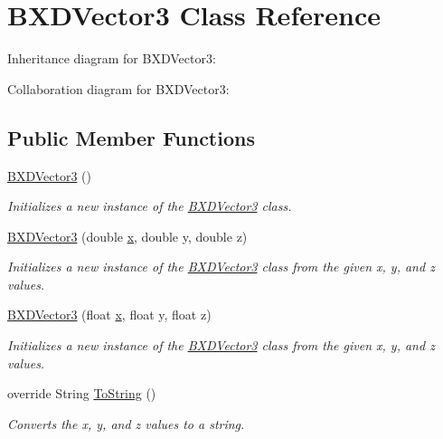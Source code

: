 \hypertarget{class_b_x_d_vector3}{}\section{B\+X\+D\+Vector3 Class Reference}
\label{class_b_x_d_vector3}


Inheritance diagram for B\+X\+D\+Vector3\+:


Collaboration diagram for B\+X\+D\+Vector3\+:
\subsection*{Public Member Functions}
\begin{DoxyCompactItemize}
\item 
\hyperlink{class_b_x_d_vector3_a0e2a2ec4422390656dc569146bbceb5b}{B\+X\+D\+Vector3} ()
\begin{DoxyCompactList}\small\item\em Initializes a new instance of the \hyperlink{class_b_x_d_vector3}{B\+X\+D\+Vector3} class. \end{DoxyCompactList}\item 
\hyperlink{class_b_x_d_vector3_a586261e067ed628788df3fede2d96427}{B\+X\+D\+Vector3} (double \hyperlink{class_b_x_d_vector3_a46633bfd92ba8052494bc1918d1762a4}{x}, double y, double z)
\begin{DoxyCompactList}\small\item\em Initializes a new instance of the \hyperlink{class_b_x_d_vector3}{B\+X\+D\+Vector3} class from the given x, y, and z values. \end{DoxyCompactList}\item 
\hyperlink{class_b_x_d_vector3_a587219cbfe9a71512df003856ad79b7a}{B\+X\+D\+Vector3} (float \hyperlink{class_b_x_d_vector3_a46633bfd92ba8052494bc1918d1762a4}{x}, float y, float z)
\begin{DoxyCompactList}\small\item\em Initializes a new instance of the \hyperlink{class_b_x_d_vector3}{B\+X\+D\+Vector3} class from the given x, y, and z values. \end{DoxyCompactList}\item 
override String \hyperlink{class_b_x_d_vector3_a2ab3c8442aada6617e4d779899e20b09}{To\+String} ()
\begin{DoxyCompactList}\small\item\em Converts the x, y, and z values to a string. \end{DoxyCompactList}\item 

\end{DoxyCompactItemize}
